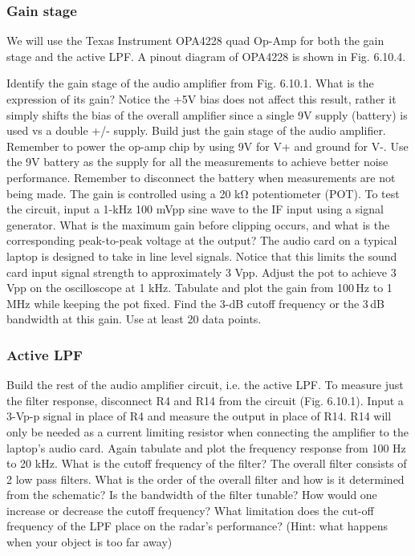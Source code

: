 \documentclass[letterpaper, 11pt]{article}
\begin{document}
\subsubsection{Gain stage}

We will use the Texas Instrument OPA4228 quad Op-Amp for both the gain stage and the active LPF. A pinout diagram of OPA4228 is shown in Fig. 6.10.4.

Identify the gain stage of the audio amplifier from Fig. 6.10.1. What is the expression of its gain? Notice the +5V bias does not affect this result, rather it simply shifts the bias of the overall amplifier since a single 9V supply (battery) is used vs a double +/- supply.
Build just the gain stage of the audio amplifier. Remember to power the op-amp chip by using 9V for V+ and ground for V-. Use the 9V battery as the supply for all the measurements to achieve better noise performance. Remember to disconnect the battery when measurements are not being made.
The gain is controlled using a 20 kΩ potentiometer (POT). To test the circuit, input a 1-kHz 100 mVpp sine wave to the IF input using a signal generator. What is the maximum gain before clipping occurs, and what is the corresponding peak-to-peak voltage at the output?
The audio card on a typical laptop is designed to take in line level signals. Notice that this limits the sound card input signal strength to approximately 3 Vpp. Adjust the pot to achieve 3 Vpp on the oscilloscope at 1 kHz. Tabulate and plot the gain from 100\,Hz to 1\,MHz while keeping the pot fixed. Find the 3-dB cutoff frequency or the 3\,dB bandwidth at this gain. Use at least 20 data points.

\subsubsection{Active LPF}
Build the rest of the audio amplifier circuit, i.e. the active LPF. To measure just the filter response, disconnect R4 and R14 from the circuit (Fig. 6.10.1). Input a 3-Vp-p signal in place of R4 and measure the output in place of R14. R14 will only be needed as a current limiting resistor when connecting the amplifier to the laptop’s audio card. Again tabulate and plot the frequency response from 100 Hz to 20 kHz. What is the cutoff frequency of the filter?
The overall filter consists of 2 low pass filters. What is the order of the overall filter and how is it determined from the schematic? Is the bandwidth of the filter tunable? How would one increase or decrease the cutoff frequency?
What limitation does the cut-off frequency of the LPF place on the radar’s performance?  (Hint: what happens when your object is too far away)
\end{document}
